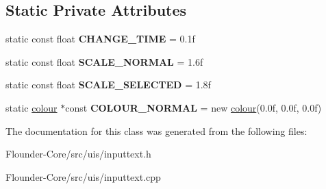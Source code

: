 \subsection*{Static Private Attributes}
\begin{DoxyCompactItemize}
\item 
\mbox{\label{classflounder_1_1inputtext_a82ca2663330304dbfe7eec79f7e0bdfa}} 
static const float {\bfseries C\+H\+A\+N\+G\+E\+\_\+\+T\+I\+ME} = 0.\+1f
\item 
\mbox{\label{classflounder_1_1inputtext_a052377a3ef7aab2b654dca4af3f6afc8}} 
static const float {\bfseries S\+C\+A\+L\+E\+\_\+\+N\+O\+R\+M\+AL} = 1.\+6f
\item 
\mbox{\label{classflounder_1_1inputtext_a839f88d5217fe664f4d27e2c813a7b55}} 
static const float {\bfseries S\+C\+A\+L\+E\+\_\+\+S\+E\+L\+E\+C\+T\+ED} = 1.\+8f
\item 
\mbox{\label{classflounder_1_1inputtext_a52effd83ca83261bc2ebc8acd16279e7}} 
static \hyperlink{classflounder_1_1colour}{colour} $\ast$const {\bfseries C\+O\+L\+O\+U\+R\+\_\+\+N\+O\+R\+M\+AL} = new \hyperlink{classflounder_1_1colour}{colour}(0.\+0f, 0.\+0f, 0.\+0f)
\end{DoxyCompactItemize}


The documentation for this class was generated from the following files\+:\begin{DoxyCompactItemize}
\item 
Flounder-\/\+Core/src/uis/inputtext.\+h\item 
Flounder-\/\+Core/src/uis/inputtext.\+cpp\end{DoxyCompactItemize}
